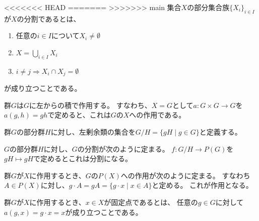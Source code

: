 \begin{definition}
    \label{decomposition-def}
<<<<<<< HEAD
=======
>>>>>>> main
    \leanok    
    集合$X$の部分集合族$\{X_i\}_{i\in I}$が$X$の分割であるとは、
    \begin{enumerate}
        \item 任意の$i\in I$について$X_i\neq\emptyset$
        \item $X=\bigcup_{i\in I}X_i$
        \item $i\neq j\Rightarrow X_i\cap X_j=\emptyset$
    \end{enumerate}
    が成り立つことである。
\end{definition}

\begin{proposition}
    \label{left-multiplication}
    群$G$は$G$に左からの積で作用する。
    すなわち、$X=G$として$a:G\times G\to G$を$a(g,h)=gh$で定めると、これは$G$の$X$への作用である。
\end{proposition}

\begin{definition}
    \label{quotient-def}
    群$G$の部分群$H$に対し、左剰余類の集合を$G/H=\{gH\mid g\in G\}$と定義する。
\end{definition}

\begin{proposition}
    \label{subgroup-decomp}
    $G$の部分群$H$に対し、$G$の分割が次のように定まる。
    $f:G/H\to P(G)$を$gH\mapsto gH$で定めるとこれは分割になる。
\end{proposition}

\begin{proposition}
    \label{powerset-action}
    群$G$が$X$に作用するとき、$G$の$P(X)$への作用が次のように定まる。
    すなわち$A\in P(X)$に対し、$g\cdot A=gA=\{g\cdot x\mid x\in A\}$と定める。
    これが作用となる。
\end{proposition}

\begin{proposition}
    \label{fixed-point}
    群$G$が$X$に作用するとき、$x\in X$が固定点であるとは、
    任意の$g\in G$に対して$a(g,x)=g\cdot x=x$が成り立つことである。
\end{proposition}


